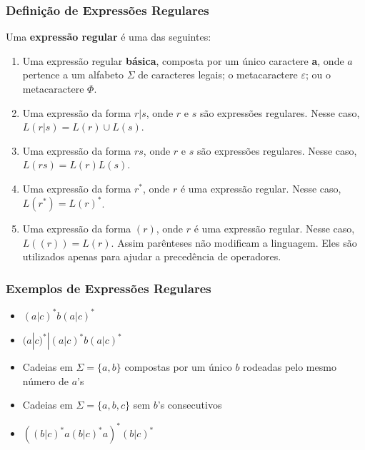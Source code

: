 \documentclass[table]{beamer}
\begin{document}
\begin{frame}
   \frametitle{Definição de Expressões Regulares}
   \begin{block}{Uma \textbf{expressão regular} é uma das seguintes:}
      \begin{enumerate}
         \item Uma expressão regular \textbf{básica}, composta por um único caractere \textbf{a}, onde $a$ pertence a um alfabeto $\Sigma$ de caracteres legais; o metacaractere $\varepsilon$; ou o metacaractere $\Phi$.
	 \item Uma expressão da forma $r|s$, onde $r$ e $s$ são expressões regulares. Nesse caso, $L(r|s) = L(r) \cup L(s)$.
	 \item Uma expressão da forma $rs$, onde $r$ e $s$ são expressões regulares. Nesse caso, $L(rs) = L(r)L(s)$.
	 \item Uma expressão da forma $r^{*}$, onde $r$ é uma expressão regular. Nesse caso, $L(r^{*}) = L(r)^{*}$.
	 \item Uma expressão da forma $(r)$, onde $r$ é uma expressão regular. Nesse caso, $L((r))=L(r)$. Assim parênteses não modificam a linguagem. Eles são utilizados apenas para ajudar a precedência de operadores.
      \end{enumerate}
   \end{block}
\end{frame}

\begin{frame}
   \frametitle{Exemplos de Expressões Regulares}
   \begin{itemize}
      \item $(a|c)^{*}b(a|c)^{*}$
      \item $(a|c)^{*}|(a|c)^{*}b(a|c)^{*}$
      \item Cadeias em $\Sigma = \{a,b\}$ compostas por um único $b$ rodeadas pelo mesmo número de $a$'s
      \item Cadeias em $\Sigma = \{a,b,c\}$ sem $b$'s consecutivos 
      \item $((b|c)^{*}a(b|c)^{*}a)^{*}(b|c)^{*}$
   \end{itemize}
\end{frame}
\end{document}

